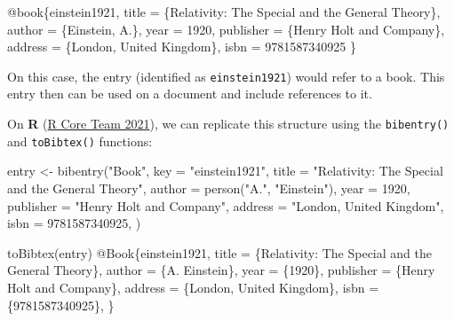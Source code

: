 \documentclass[
]{article}
\newenvironment{Shaded}{\begin{snugshade}}{\end{snugshade}}
\newcommand{\AttributeTok}[1]{\textcolor[rgb]{0.77,0.63,0.00}{#1}}
\newcommand{\DataTypeTok}[1]{\textcolor[rgb]{0.13,0.29,0.53}{#1}}
\newcommand{\DecValTok}[1]{\textcolor[rgb]{0.00,0.00,0.81}{#1}}
\newcommand{\FunctionTok}[1]{\textcolor[rgb]{0.00,0.00,0.00}{#1}}
\newcommand{\NormalTok}[1]{#1}
\newcommand{\OtherTok}[1]{\textcolor[rgb]{0.56,0.35,0.01}{#1}}
\newcommand{\SpecialCharTok}[1]{\textcolor[rgb]{0.00,0.00,0.00}{#1}}
\newcommand{\StringTok}[1]{\textcolor[rgb]{0.31,0.60,0.02}{#1}}
\newcommand{\VariableTok}[1]{\textcolor[rgb]{0.00,0.00,0.00}{#1}}
\begin{document}
\begin{Shaded}
\begin{Highlighting}[]
\VariableTok{@book}\NormalTok{\{}\OtherTok{einstein1921}\NormalTok{,}
    \DataTypeTok{title}\NormalTok{        = \{Relativity: The Special and the General Theory\},}
    \DataTypeTok{author}\NormalTok{       = \{Einstein, A.\},}
    \DataTypeTok{year}\NormalTok{         = 1920,}
    \DataTypeTok{publisher}\NormalTok{    = \{Henry Holt and Company\},}
    \DataTypeTok{address}\NormalTok{      = \{London, United Kingdom\},}
    \DataTypeTok{isbn}\NormalTok{         = 9781587340925}
\NormalTok{\}}
\end{Highlighting}
\end{Shaded}

On this case, the entry (identified as \texttt{einstein1921}) would
refer to a book. This entry then can be used on a document and include
references to it.

On \textbf{R} (\protect\hyperlink{ref-R_2021}{R Core Team 2021}), we can
replicate this structure using the \texttt{bibentry()} and
\texttt{toBibtex()} functions:

\begin{Shaded}
\begin{Highlighting}[]

\NormalTok{entry }\OtherTok{\textless{}{-}} \FunctionTok{bibentry}\NormalTok{(}\StringTok{"Book"}\NormalTok{,}
  \AttributeTok{key =} \StringTok{"einstein1921"}\NormalTok{,}
  \AttributeTok{title =} \StringTok{"Relativity: The Special and the General Theory"}\NormalTok{,}
  \AttributeTok{author =} \FunctionTok{person}\NormalTok{(}\StringTok{"A."}\NormalTok{, }\StringTok{"Einstein"}\NormalTok{),}
  \AttributeTok{year =} \DecValTok{1920}\NormalTok{,}
  \AttributeTok{publisher =} \StringTok{"Henry Holt and Company"}\NormalTok{,}
  \AttributeTok{address =} \StringTok{"London, United Kingdom"}\NormalTok{,}
  \AttributeTok{isbn =} \DecValTok{9781587340925}\NormalTok{,}
\NormalTok{)}

\FunctionTok{toBibtex}\NormalTok{(entry)}
\SpecialCharTok{@}\NormalTok{Book\{einstein1921,}
\NormalTok{  title }\OtherTok{=}\NormalTok{ \{Relativity}\SpecialCharTok{:}\NormalTok{ The Special and the General Theory\},}
\NormalTok{  author }\OtherTok{=}\NormalTok{ \{A. Einstein\},}
\NormalTok{  year }\OtherTok{=}\NormalTok{ \{}\DecValTok{1920}\NormalTok{\},}
\NormalTok{  publisher }\OtherTok{=}\NormalTok{ \{Henry Holt and Company\},}
\NormalTok{  address }\OtherTok{=}\NormalTok{ \{London, United Kingdom\},}
\NormalTok{  isbn }\OtherTok{=}\NormalTok{ \{}\DecValTok{9781587340925}\NormalTok{\},}
\NormalTok{\}}
\end{Highlighting}
\end{Shaded}
\end{document}
